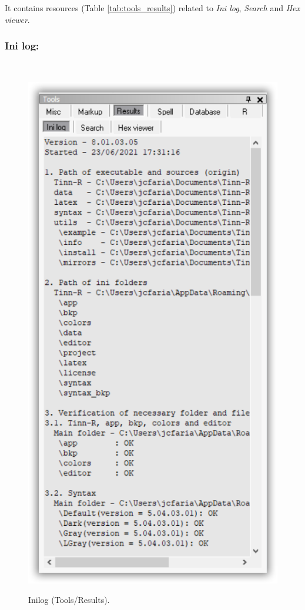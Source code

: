 It contains resources
(Table \ref{tab:tools_results})
related to \textit{Ini log}, \textit{Search} and \textit{Hex viewer}.


\subsubsection{Ini log:}
\\

\begin{figure}[H]
  \includegraphics[scale=0.35]{./res/tools_results_inilog.png}\\
  \caption{Inilog (Tools/Results).}
  \label{fig:tools_results_inilog}
\end{figure}

